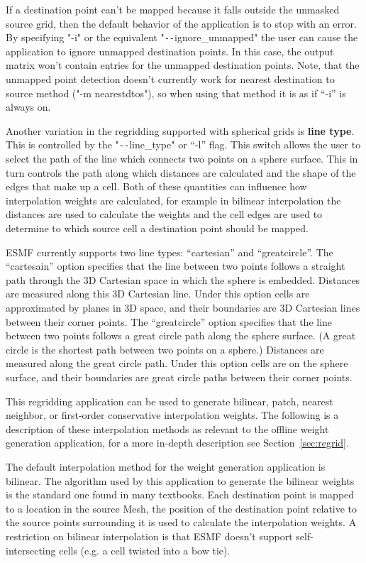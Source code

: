 If a destination point can't be mapped because it falls outside the unmasked source grid, then the default behavior of the application is to stop with an error. By specifying "-i" or the equivalent "\verb+--+ignore\_unmapped" the user can cause the application to ignore unmapped destination points. In this case, the output matrix won't contain entries for the unmapped destination points. Note, that the unmapped point detection doesn't
currently work for nearest destination to source method ("-m nearestdtos"), so when using that method it is as if ``-i'' is always on.

 Another variation in the regridding supported with spherical grids is {\bf line type}. This is controlled by the "\verb+--+line\_type" or ``-l'' flag. This switch allows the user to select the path of the line which connects
two points on a sphere surface. This in turn controls the path along which distances are calculated and the shape of 
the edges that make up a cell. Both of these quantities can influence how interpolation weights are calculated, for example in
bilinear interpolation the distances are used to calculate the weights and the cell edges are used to determine to which source 
cell a destination point should be mapped. 

ESMF currently supports two line types: ``cartesian'' and ``greatcircle''. The ``cartesain'' option 
specifies that the line between two points follows a straight path through the 3D Cartesian space in which the sphere is embedded.
Distances are measured along  this 3D Cartesian line. Under this option cells are approximated by planes in 3D space, and their boundaries are 
3D Cartesian lines between their corner points.  The ``greatcircle'' option specifies that the line between two points follows
a great circle path along the sphere surface. (A great circle is the shortest path between two points on a sphere.) 
Distances are measured along the great circle path. Under this option cells are on the sphere surface, and their boundaries 
are great circle paths between their corner points. 

 This regridding application can be used to generate bilinear, patch, nearest neighbor, or first-order conservative interpolation weights. The following is a description of these interpolation methods as relevant to the offline weight generation application, for a more in-depth description see Section~\ref{sec:regrid}.

 The default interpolation method for the weight generation application is bilinear. The algorithm used by this application to 
generate the bilinear weights is the standard one found in many textbooks.  Each destination point is mapped to a location
in the source Mesh, the position of the destination point relative to the source points surrounding it is used to calculate the interpolation weights. A restriction on
bilinear interpolation is that ESMF doesn't support self-intersecting cells (e.g. a cell twisted into a bow tie). 

